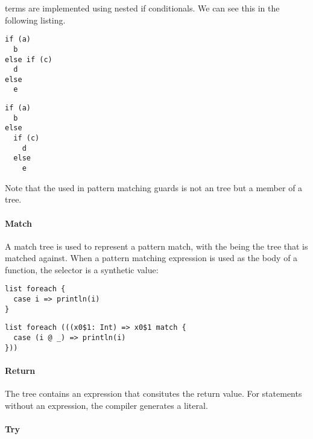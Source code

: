  terms are implemented using nested if conditionals. We can see this in the following listing.

\begin{multicols}{2}
\begin{lstlisting}
if (a)
  b
else if (c)
  d
else
  e

\end{lstlisting}
\begin{lstlisting}
if (a)
  b
else
  if (c)
    d
  else
    e
\end{lstlisting}
\end{multicols}

Note that the  used in pattern matching guards is not an  tree but a member of a  tree.

\paragraph{Match} 

\noindent A match tree is used to represent a pattern match, with the  being the tree that is matched against. When a pattern matching expression is used as the body of a function, the selector is a synthetic value:

\begin{multicols}{2}
\begin{lstlisting}
list foreach {
  case i => println(i)
}
\end{lstlisting}
\begin{lstlisting}
list foreach (((x0$1: Int) => x0$1 match {
  case (i @ _) => println(i)
}))
\end{lstlisting}
\end{multicols}

\paragraph{Return} 

\noindent The  tree contains an expression that consitutes the return value. For  statements without an expression, the compiler generates a \src{()} literal.

\paragraph{Try} 

